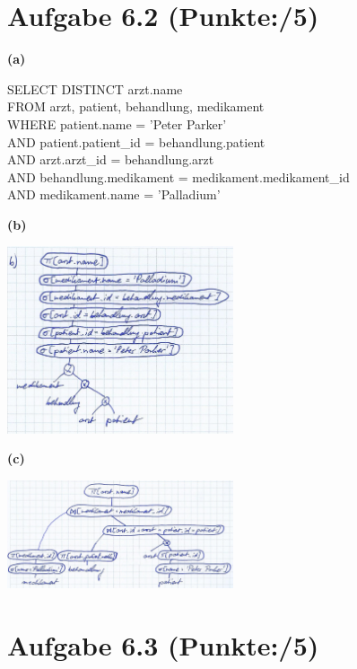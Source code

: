 \documentclass[11pt, a4paper]{article}
\newcommand{\blattnummer}{6}
\newcommand{\pp}{5}
\newcommand{\ppp}{5}
\newcommand{\aufgabe}[2] {\section*{Aufgabe \blattnummer.#1 (Punkte:\qquad/#2)}}
\newcommand{\aufgabenteil}[1] {\textbf{(#1)}}
\begin{document}
\aufgabe{2}{\pp}
\aufgabenteil{a}
\begin{adjustwidth}{20pt}{20pt}
\begin{tt}
SELECT DISTINCT arzt.name\\
FROM arzt, patient, behandlung, medikament\\
WHERE patient.name = 'Peter Parker'\\
\null\qquad AND patient.patient\_id = behandlung.patient\\
\null\qquad AND arzt.arzt\_id = behandlung.arzt\\
\null\qquad AND behandlung.medikament = medikament.medikament\_id\\
\null\qquad AND medikament.name = 'Palladium'\\
\end{tt}
\end{adjustwidth}
\aufgabenteil{b}
\begin{adjustwidth}{20pt}{20pt}
\begin{center}
\includegraphics[width=0.5\textwidth]{a2b.jpg}
\end{center}
\end{adjustwidth}
\aufgabenteil{c}
\begin{adjustwidth}{20pt}{20pt}
\begin{center}
\includegraphics[width=0.5\textwidth]{a2c.jpg}
\end{center}
\end{adjustwidth}



\aufgabe{3}{\ppp}
\begin{adjustwidth}{20pt}{20pt}

\end{adjustwidth}


\end{document}
